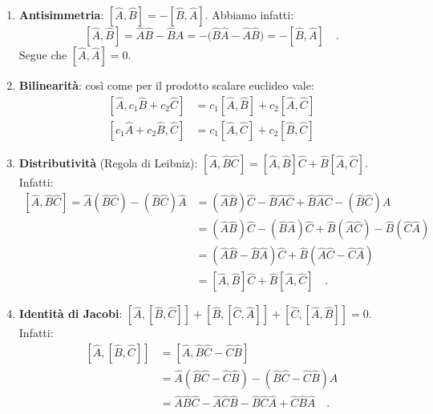 \begin{enumerate}
    \item \textbf{Antisimmetria}: $[\hat{A}, \hat{B}] = -[\hat{B}, \hat{A}]$. Abbiamo infatti:
    \[
        [\hat{A}, \hat{B}] = \hat{A}\hat{B} - \hat{B} \hat{A} = - \big( \hat{B} \hat{A} - \hat{A}\hat{B} \big) = -[\hat{B}, \hat{A}] \quad.
    \]
    Segue che $[\hat{A}, \hat{A}] = 0$. 
    \item \textbf{Bilinearità}: così come per il prodotto scalare euclideo vale:
    \[
        \begin{aligned}
        [\hat{A}, c_1\hat{B} + c_2\hat{C}] &= c_1[\hat{A}, \hat{B}] + c_2[\hat{A}, \hat{C}] \\
        [c_1\hat{A} + c_2\hat{B}, \hat{C}] &= c_1[\hat{A}, \hat{C}] + c_2[\hat{B}, \hat{C}]
        \end{aligned}
    \]
    \item \textbf{Distributività} (Regola di Leibniz): $[\hat{A}, \hat{B}\hat{C}] = [\hat{A}, \hat{B}]\hat{C} + \hat{B}[\hat{A}, \hat{C}]$. Infatti:
    \[
    \begin{aligned}
               [\hat{A}, \hat{B}\hat{C}] = \hat{A}(\hat{B}\hat{C}) - (\hat{B}\hat{C})\hat{A} &= (\hat{A}\hat{B})\hat{C} - \hat{B}\hat{A}\hat{C} + \hat{B}\hat{A}\hat{C} - (\hat{B}\hat{C})\hat{A} \\
               &= (\hat{A}\hat{B})\hat{C} - (\hat{B}\hat{A})\hat{C} + \hat{B}(\hat{A}\hat{C}) - \hat{B}(\hat{C}\hat{A}) \\
               &= (\hat{A}\hat{B}-\hat{B}\hat{A})\hat{C} + \hat{B}(\hat{A}\hat{C} - \hat{C}\hat{A}) \\
               &= [\hat{A}, \hat{B}]\hat{C} + \hat{B}[\hat{A}, \hat{C}] \quad.
    \end{aligned}
    \]
    \item \textbf{Identità di Jacobi}: $[\hat{A}, [\hat{B}, \hat{C}]] + [\hat{B}, [\hat{C}, \hat{A}]] + [\hat{C}, [\hat{A}, \hat{B}]] = 0$. Infatti:
    \begin{equation*}
    \begin{aligned}
        [\hat{A}, [\hat{B}, \hat{C}]] &= [\hat{A}, \hat{B}\hat{C} - \hat{C}\hat{B}] \\
        &= \hat{A}(\hat{B}\hat{C} - \hat{C}\hat{B}) - (\hat{B}\hat{C} - \hat{C}\hat{B})\hat{A} \\
        &= \hat{A}\hat{B}\hat{C} - \hat{A}\hat{C}\hat{B} - \hat{B}\hat{C}\hat{A} + \hat{C}\hat{B}\hat{A} \quad.
    \end{aligned}
\end{equation*}

\end{enumerate}
